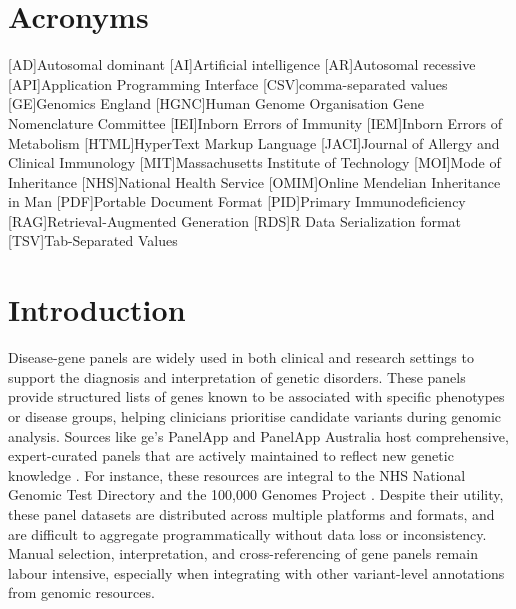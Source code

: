 \section*{Acronyms}
\renewenvironment{description} %
{\list{}{\labelwidth0pt\itemindent-\leftmargin
    \parsep-1em\itemsep0pt\let\makelabel\descriptionlabel}}
               {\endlist}
\begin{acronym} 
[AD]{Autosomal dominant}
[AI]{Artificial intelligence}
[AR]{Autosomal recessive}
[API]{Application Programming Interface}
[CSV]{comma-separated values}
[GE]{Genomics England}
[HGNC]{Human Genome Organisation Gene Nomenclature Committee}
[IEI]{Inborn Errors of Immunity}
[IEM]{Inborn Errors of Metabolism}
[HTML]{HyperText Markup Language}
[JACI]{Journal of Allergy and Clinical Immunology}
[MIT]{Massachusetts Institute of Technology}
[MOI]{Mode of Inheritance}
[NHS]{National Health Service}
[OMIM]{Online Mendelian Inheritance in Man}
[PDF]{Portable Document Format}
[PID]{Primary Immunodeficiency}
[RAG]{Retrieval-Augmented Generation}
[RDS]{R Data Serialization format}
[TSV]{Tab-Separated Values}
\end{acronym} 
 

\section{Introduction}
\noindent
Disease-gene panels are widely used in both clinical and research settings to support the diagnosis and interpretation of genetic disorders. 
These panels provide structured lists of genes known to be associated with specific phenotypes or disease groups, helping clinicians prioritise candidate variants during genomic analysis. 
Sources like \ac{ge}’s PanelApp and PanelApp Australia host comprehensive, expert-curated panels that are actively maintained to reflect new genetic knowledge \cite{martin_panelapp_2019}. 
For instance, these resources are integral to the NHS National Genomic Test Directory and the 100,000 Genomes Project \cite{martin_panelapp_2019}. 
Despite their utility, these panel datasets are distributed across multiple platforms and formats, and are difficult to aggregate programmatically without data loss or inconsistency. 
Manual selection, interpretation, and cross-referencing of gene panels remain labour intensive, especially when integrating with other variant-level annotations from genomic resources. 

